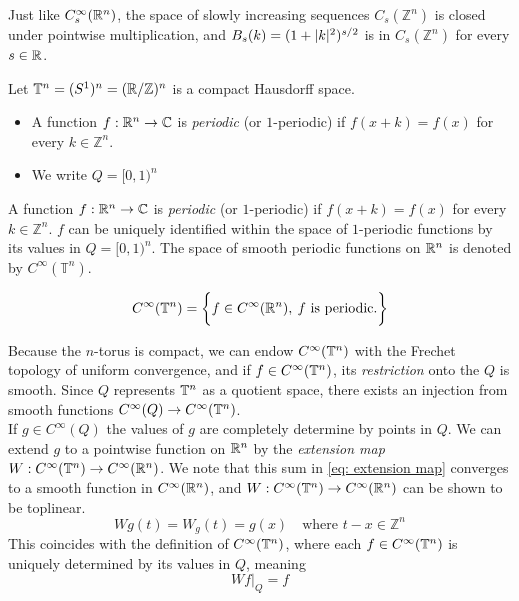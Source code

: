 \documentclass[../main-v2-manifolds.tex]{subfiles}
\begin{document}
\begin{remark}
Just like $C^\infty_s({\mathbb{R}^n})$, the space of slowly increasing sequences $C_s(\mathbb{Z}^n)$ is closed under pointwise multiplication, and $B_s(k) = (1+\vert {k} \vert^2)^{s/2}$ is in $C_s(\mathbb{Z}^n)$ for every $s\in\mathbb{R}$.
\end{remark}
Let $\mathbb{T}^n = (S^1)^n = (\mathbb{R}/\mathbb{Z})^n$ is a compact Hausdorff space. 
\begin{itemize}
    \item A function $f: {\mathbb{R}^n}\to\mathbb{C}$ is \emph{periodic} (or $1$-periodic) if $f(x+k) = f(x)$ for every $k\in\mathbb{Z}^n$. 
    \item We write $Q = [0,1)^n$
\end{itemize}


\begin{definition}
A function $f: {\mathbb{R}^n}\to\mathbb{C}$ is \emph{periodic} (or $1$-periodic) if $f(x+k) = f(x)$ for every $k\in\mathbb{Z}^n$. $f$ can be uniquely identified within the space of $1$-periodic functions by its values in $Q=[0,1)^n$. The space of smooth periodic functions on ${\mathbb{R}^n}$ is denoted by $C^\infty(\mathbb{T}^n)$.

\[
C^\infty({\mathbb{T}^n}) = \biggl\{{f\in C^\infty({\mathbb{R}^n}),\: f\text{ is periodic.}}\biggr\}
\]
\end{definition}

    Because the $n$-torus is compact, we can endow $C^\infty({\mathbb{T}^n})$ with the Frechet topology of uniform convergence, and if $f\in C^\infty({\mathbb{T}^n})$, its \emph{restriction} onto the $Q$ is smooth. Since $Q$ represents ${\mathbb{T}^n}$ as a quotient space, there exists an injection from smooth functions $C^\infty(Q)\to C^\infty({\mathbb{T}^n})$. \\

If $g\in C^\infty(Q)$ the values of $g$ are completely determine by points in $Q$. We can extend $g$ to a pointwise function on ${\mathbb{R}^n}$ by the \emph{extension map} $W: C^\infty({\mathbb{T}^n})\to C^\infty({\mathbb{R}^n})$. We note that this sum in \cref{eq: extension map} converges to a smooth function in $C^\infty({\mathbb{R}^n})$, and $W: C^\infty({\mathbb{T}^n})\to C^\infty({\mathbb{R}^n})$ can be shown to be toplinear.
\begin{equation}
Wg(t) = W_g(t) = g(x)\quad \text{where } t-x\in\mathbb{Z}^n
\label{eq: extension map}
\end{equation}
This coincides with the definition of $C^\infty({\mathbb{T}^n})$, where each $f\in C^\infty({\mathbb{T}^n})$ is uniquely determined by its values in $Q$, meaning
\[
W {f\vert_{Q}} = f
\]
\end{document}
